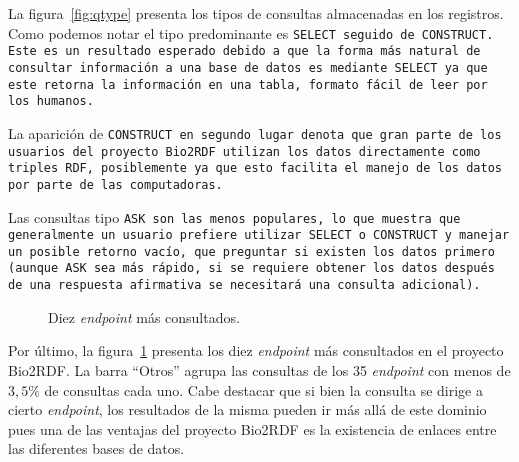 La figura~\ref{fig:qtype} presenta los tipos de consultas almacenadas en los
registros. Como podemos notar el tipo predominante es \tt{SELECT} seguido de
\tt{CONSTRUCT}. Este es un resultado esperado debido a que la forma más natural
de consultar información a una base de datos es mediante \tt{SELECT} ya que este
retorna la información en una tabla, formato fácil de leer por los humanos.

La aparición de \tt{CONSTRUCT} en segundo lugar denota que gran parte de los
usuarios del proyecto Bio2RDF utilizan los datos directamente como  triples RDF,
posiblemente ya que esto facilita el manejo de los datos por parte de las
computadoras.

Las consultas tipo \tt{ASK} son las menos populares, lo que muestra que
generalmente un usuario prefiere utilizar \tt{SELECT} o \tt{CONSTRUCT} y manejar
un posible retorno vacío, que preguntar si existen los datos primero (aunque
\tt{ASK} sea más rápido, si se requiere obtener los datos después de una
respuesta afirmativa se necesitará una consulta adicional).


\begin{figure}[ht]
  \caption{Diez \emph{endpoint} más consultados.}\label{fig:t10endp}
\end{figure}

Por último, la figura~\ref{fig:t10endp} presenta los diez \emph{endpoint} más
consultados en el proyecto Bio2RDF. La barra ``Otros'' agrupa las consultas de
los 35 \emph{endpoint} con menos de $3,5\%$ de consultas cada uno. Cabe destacar
que si bien la consulta se dirige a cierto \emph{endpoint}, los resultados de la
misma pueden ir más allá de este dominio pues una de las ventajas del proyecto
Bio2RDF es la existencia de enlaces entre las diferentes bases de datos.

